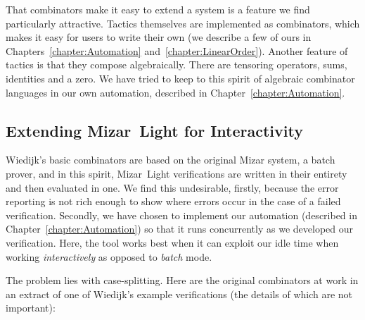That combinators make it easy to extend a system is a feature we find particularly attractive. Tactics themselves are implemented as combinators, which makes it easy for users to write their own (we describe a few of ours in Chapters~\ref{chapter:Automation} and~\ref{chapter:LinearOrder}). Another feature of tactics is that they compose algebraically. There are tensoring operators, sums, identities and a zero. We have tried to keep to this spirit of algebraic combinator languages in our own automation, described in Chapter~\ref{chapter:Automation}.

\subsection{Extending Mizar~Light for Interactivity}\label{sec:MizarLightExtend}
Wiedijk's basic combinators are based on the original Mizar system, a batch prover, and in this spirit,  Mizar~Light verifications are written in their entirety and then evaluated in one. We find this undesirable, firstly, because the error reporting is not rich enough to show where errors occur in the case of a failed verification. Secondly, we have chosen to implement our automation (described in Chapter~\ref{chapter:Automation}) so that it runs concurrently as we developed our verification. Here, the tool works best when it can exploit our idle time when working \emph{interactively} as opposed to \emph{batch} mode.

The problem lies with case-splitting. Here are the original combinators at work in an extract of one of Wiedijk's example verifications (the details of which are not important):

\vspace{0.5cm}
\begin{minipage}{\linewidth}
  \footnotesize



  \code{\enspace [fix ["p1:Point"; "p2:Point"];}


  \code{\quad\enspace[[suppose "p1 = p2";}

  \code{\qquad\enspace qed from [0] by [LEMMA1]];}

  \code{\qquad [suppose "$\neg$(p1 = p2)";}

  \code{\qquad\enspace qed from [1]]]];}

\end{minipage}
\vspace{0.5cm}

